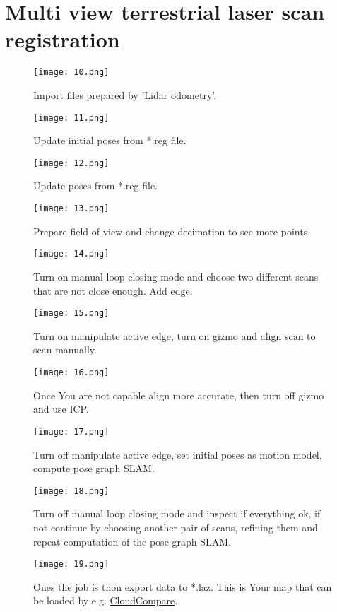 \chapter{Multi view terrestrial laser scan registration}

\begin{figure}
	\centering
	\texttt{[image: 10.png]}
	\caption{Import files prepared by 'Lidar odometry'.}
	\label{fig:10}
\end{figure}

\begin{figure}
	\centering
	\texttt{[image: 11.png]}
	\caption{Update initial poses from *.reg file.}
	\label{fig:11}
\end{figure}


\begin{figure}
	\centering
	\texttt{[image: 12.png]}
	\caption{Update poses from *.reg file.}
	\label{fig:12}
\end{figure}

\begin{figure}
	\centering
	\texttt{[image: 13.png]}
	\caption{Prepare field of view and change decimation to see more points.}
	\label{fig:13}
\end{figure}

\begin{figure}
	\centering
	\texttt{[image: 14.png]}
	\caption{Turn on manual loop closing mode and choose two different scans that are not close enough. Add edge.}
	\label{fig:14}
\end{figure}


\begin{figure}
	\centering
	\texttt{[image: 15.png]}
	\caption{Turn on manipulate active edge, turn on gizmo and align scan to scan manually.}
	\label{fig:15}
\end{figure}

\begin{figure}
	\centering
	\texttt{[image: 16.png]}
	\caption{Once You are not capable align more accurate, then turn off gizmo and use ICP.}
	\label{fig:16}
\end{figure}

\begin{figure}
	\centering
	\texttt{[image: 17.png]}
	\caption{Turn off manipulate active edge, set initial poses as motion model, compute pose graph SLAM.}
	\label{fig:17}
\end{figure}

\begin{figure}
	\centering
	\texttt{[image: 18.png]}
	\caption{Turn off manual loop closing mode and inspect if everything ok, if not continue by choosing another pair of scans, refining them and repeat computation of the pose graph SLAM.}
	\label{fig:18}
\end{figure}

\begin{figure}
	\centering
	\texttt{[image: 19.png]}
	\caption{Ones the job is thon export data to *.laz. This is Your map that can be loaded by e.g. \href{https://www.cloudcompare.org/}{CloudCompare}.}
	\label{fig:19}
\end{figure}